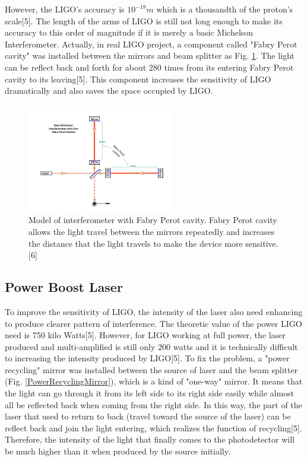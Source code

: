 \documentclass[journal,comsoc,twoside]{IEEEtran}
\begin{document}
However, the LIGO's accuracy is $10^{-18}m$ which is a thousandth of the proton's scale[5]. The length of the arms of LIGO is still not long enough to make its accuracy to this order of magnitude if it is merely a basic Michelson Interferometer. Actually, in real LIGO project, a component called "Fabry Perot cavity" was installed between the mirrors and beam splitter as Fig. \ref{FabryPerot}. The light can be reflect back and forth for about 280 times from its entering Fabry Perot cavity to its leaving[5]. This component increases the sensitivity of LIGO dramatically and also saves the space occupied by LIGO.
\begin{figure}[!t]
\centering
\includegraphics[width=2.5in]{FabryPerot.png}
\caption{Model of interferometer with Fabry Perot cavity. Fabry Perot cavity allows the light travel between the mirrors repeatedly and increases the distance that the light travels to make the device more sensitive.[6]}
\label{FabryPerot}
\end{figure}
\subsection{Power Boost Laser}
To improve the sensitivity of LIGO, the intensity of the laser also need enhancing to produce clearer pattern of interference. The theoretic value of the power LIGO need is 750 kilo Watts[5]. However, for LIGO working at full power, the laser produced and multi-amplified is still only 200 watts and it is technically difficult to increasing the intensity produced by LIGO[5]. To fix the problem, a "power recycling" mirror was installed between the source of laser and the beam splitter (Fig. \ref{PowerRecyclingMirror}), which is a kind of "one-way" mirror. It means that the light can go through it from its left side to its right side easily while almost all be reflected back when coming from the right side. In this way, the part of the laser that used to return to back (travel toward the source of the laser) can be reflect back and join the light entering, which realizes the function of recycling[5]. Therefore, the intensity of the light that finally comes to the photodetector will be much higher than it when produced by the source initially.
\end{document}
